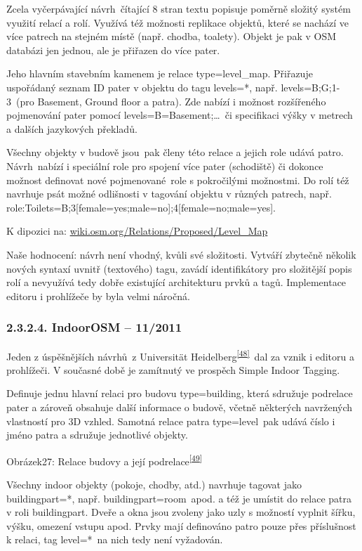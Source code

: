 Zcela vyčerpávající návrh~čítající 8 stran textu popisuje poměrně složitý systém využití relací a rolí. Využívá též možnosti replikace objektů, které se nachází ve více patrech na stejném místě (např. chodba, toalety). Objekt je pak v OSM databázi jen jednou, ale je přiřazen do více pater.

Jeho hlavním stavebním kamenem je relace type=level\_map. Přiřazuje uspořádaný seznam ID pater v objektu do tagu levels=*, např. levels=B;G;1-3~(pro Basement, Ground floor a patra). Zde nabízí i možnost rozšířeného pojmenování pater pomocí levels=B=Basement;\ldots{}~či specifikaci výšky v metrech a dalších jazykových překladů.

Všechny objekty v budově jsou~pak členy této relace a jejich role udává patro. Návrh~nabízí i speciální role pro spojení více pater (schodiště) či dokonce možnost definovat nové pojmenované~role s pokročilými možnostmi. Do rolí též navrhuje psát možné odlišnosti v tagování objektu v různých patrech, např. role:Toilets=B;3{[}female=yes;male=no{]};4{[}female=no;male=yes{]}.

K dipozici na: \href{}{wiki.osm.org/Relations/Proposed/Level\_Map}

Naše hodnocení: návrh není vhodný, kvůli své složitosti. Vytváří zbytečně několik nových syntaxí uvnitř (textového) tagu, zavádí identifikátory pro složitější popis rolí a nevyužívá tedy dobře existující architekturu prvků a tagů. Implementace editoru i prohlížeče by byla velmi náročná.

\subsubsection{2.3.2.4. IndoorOSM -- 11/2011}\label{indoorosm-112011}

Jeden z úspěšnějších návrhů~z Universität Heidelberg\textsuperscript{\href{}{{[}48{]}}}~dal za vznik i editoru a prohlížeči. V současné době je zamítnutý ve prospěch Simple Indoor Tagging.

Definuje jednu hlavní relaci pro budovu type=building, která sdružuje podrelace pater a zároveň obsahuje další informace o budově, včetně některých navržených vlastností pro 3D vzhled. Samotná relace patra type=level~pak udává číslo i jméno patra a sdružuje jednotlivé objekty.

Obrázek27: Relace budovy a její podrelace\textsuperscript{\href{}{{[}49{]}}}

Všechny indoor objekty (pokoje, chodby, atd.) navrhuje tagovat jako buildingpart=*, např. buildingpart=room~apod. a též je umístit do relace patra v roli buildingpart. Dveře a okna jsou zvoleny jako uzly s možností vyplnit šířku, výšku, omezení vstupu apod. Prvky mají definováno patro pouze přes příslušnost k relaci, tag level=*~na nich tedy není vyžadován.

